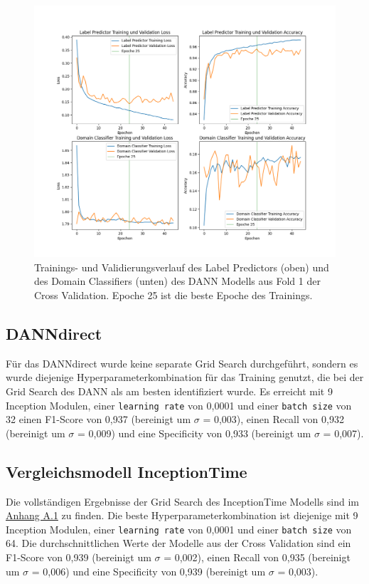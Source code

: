 \begin{figure}[!ht]%
\centering
	\includegraphics[width=1\textwidth]{./Bilder/DANN_training_fold1.png}
\caption[DANN Training Plots]{Trainings- und Validierungsverlauf des Label Predictors (oben) und des Domain Classifiers (unten) des \gls{DANN} Modells aus Fold 1 der Cross Validation. Epoche 25 ist die beste Epoche des Trainings.} 
\label{fig:DANN_training}
\end{figure} 

\subsection*{DANNdirect}

Für das \gls{DANN}direct wurde keine separate Grid Search durchgeführt, sondern es wurde diejenige Hyperparameterkombination für das Training genutzt, die bei der Grid Search des \gls{DANN} als am besten identifiziert wurde. Es erreicht mit 9 Inception Modulen, einer \texttt{learning rate} von 0,0001 und einer \texttt{batch size} von 32 einen F1-Score von 0,937 (bereinigt um $\sigma$ = 0,003), einen Recall von 0,932 (bereinigt um $\sigma$ = 0,009) und eine Specificity von 0,933 (bereinigt um $\sigma$ = 0,007). 

\subsection*{Vergleichsmodell InceptionTime}

Die vollständigen Ergebnisse der Grid Search des InceptionTime Modells sind im \hyperref[tab:GridSearch_InceptionTime]{Anhang A.1} zu finden. Die beste Hyperparameterkombination ist diejenige mit 9 Inception Modulen, einer \texttt{learning rate} von 0,0001 und einer \texttt{batch size} von 64. Die durchschnittlichen Werte der Modelle aus der Cross Validation sind ein F1-Score von 0,939 (bereinigt um $\sigma$ = 0,002), einen Recall von 0,935 (bereinigt um $\sigma$ = 0,006) und eine Specificity von 0,939 (bereinigt um $\sigma$ = 0,003).

